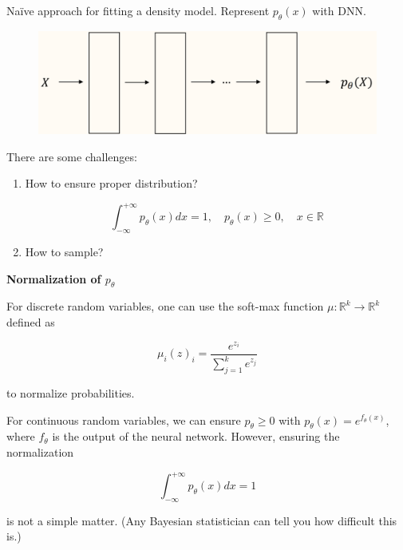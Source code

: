 \documentclass{report}
\begin{document}
\begin{concept}
    Naïve approach for fitting a density model. Represent $p_{\theta}(x)$ with DNN.

    \begin{figure}[H]
        \centering
        \includegraphics[width=1.0\textwidth]{.././assets/10.5.png}
    \end{figure}

    There are some challenges:

    \begin{enumerate}
        \item
        How to ensure proper distribution?

        $$
        \int_{-\infty}^{+\infty} p_{\theta}(x) d x=1, \quad p_{\theta}(x) \geq 0, \quad x \in \mathbb{R}
        $$
        \item How to sample?
    \end{enumerate}

    \par\noindent\textcolor{gray}{\hdashrule{\textwidth}{0.4pt}{1pt 2pt}}

    \textbf{Normalization of $p_{\theta}$}

    For discrete random variables, one can use the soft-max function $\mu: \mathbb{R}^{k} \rightarrow \mathbb{R}^{k}$ defined as

    $$
    \mu_{i}(z)_{i}=\frac{e^{z_{i}}}{\sum_{j=1}^{k} e^{z_{j}}}
    $$

    to normalize probabilities.

    For continuous random variables, we can ensure $p_{\theta} \geq 0$ with $p_{\theta}(x)=e^{f_{\theta}(x)}$, where $f_{\theta}$ is the output of the neural network. However, ensuring the normalization

    $$
    \int_{-\infty}^{+\infty} p_{\theta}(x) d x=1
    $$

    is not a simple matter. (Any Bayesian statistician can tell you how difficult this is.)

    \par\noindent\textcolor{gray}{\hdashrule{\textwidth}{0.4pt}{1pt 2pt}}


\end{concept}
\end{document}
